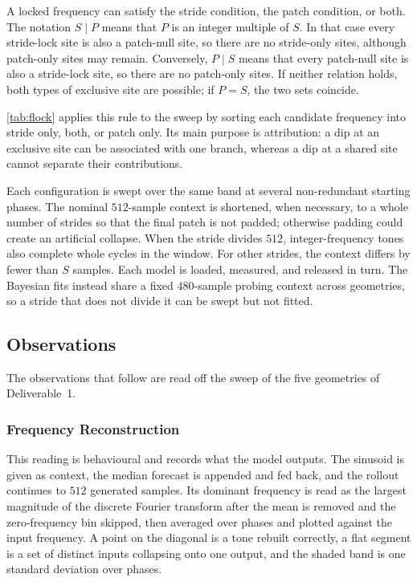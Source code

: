 A locked frequency can satisfy the stride condition, the patch condition, or both. The notation $S\mid P$ means that $P$ is an integer multiple of $S$. In that case every stride-lock site is also a patch-null site, so there are no stride-only sites, although patch-only sites may remain. Conversely, $P\mid S$ means that every patch-null site is also a stride-lock site, so there are no patch-only sites. If neither relation holds, both types of exclusive site are possible; if $P=S$, the two sets coincide.

\autoref{tab:flock} applies this rule to the sweep by sorting each candidate frequency into stride only, both, or patch only. Its main purpose is attribution: a dip at an exclusive site can be associated with one branch, whereas a dip at a shared site cannot separate their contributions.

Each configuration is swept over the same band at several non-redundant starting phases. The nominal $512$-sample context is shortened, when necessary, to a whole number of strides so that the final patch is not padded; otherwise padding could create an artificial collapse. When the stride divides $512$, integer-frequency tones also complete whole cycles in the window. For other strides, the context differs by fewer than $S$ samples. Each model is loaded, measured, and released in turn. The Bayesian fits instead share a fixed $480$-sample probing context across geometries, so a stride that does not divide it can be swept but not fitted.



\subsection{Observations}
The observations that follow are read off the sweep of the five geometries of Deliverable~1.

\subsubsection{Frequency Reconstruction}
This reading is behavioural and records what the model outputs. The sinusoid is given as context, the median forecast is appended and fed back, and the rollout continues to $512$ generated samples. Its dominant frequency is read as the largest magnitude of the discrete Fourier transform after the mean is removed and the zero-frequency bin skipped, then averaged over phases and plotted against the input frequency. A point on the diagonal is a tone rebuilt correctly, a flat segment is a set of distinct inputs collapsing onto one output, and the shaded band is one standard deviation over phases.

